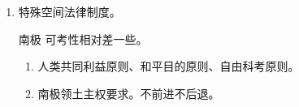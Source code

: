 \begin{enumerate}
        \begin{kk}{国际海峡}
          \begin{enumerate}
            \item 两端连接的是公海 \hz 专属经济区。
            \item 通行制度（最最重要）。
                  \begin{enumerate}
                    \item 过境通行制。飞机船舶不经许可、不打招呼、无害通过。
                    \item 无害通过权（船）。一国大陆和该国岛屿构成的国际海峡且该岛屿一面方便的。
                    \item 如果够宽中间航道，自由通行制，可走走停停。
                    \item 沿岸国可以（是权利）。
                  \end{enumerate}
          \end{enumerate}
        \end{kk}
  \item 特殊空间法律制度。
        \begin{kk}{南极}
          可考性相对差一些。
          \begin{enumerate}
            \item 人类共同利益原则、和平目的原则、自由科考原则。
            \item {}南极领土主权要求。不前进不后退。
          \end{enumerate}
        \end{kk}


\end{enumerate}
